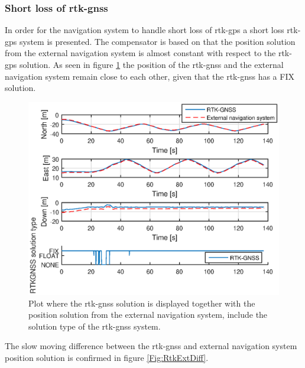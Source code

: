 \subsubsection{Short loss of \gls{rtk-gnss}}\label{ss:ShortLoss}
In order for the navigation system to handle short loss of \gls{rtk-gps} a short loss \gls{rtk-gps} system is presented. The compensator is based on that the position solution from the external navigation system is almost constant with respect to the \gls{rtk-gps} solution. As seen in figure \ref{Fig:RTKExternal} the position of the \gls{rtk-gnss} and the external navigation system remain  close to each other, given that the \gls{rtk-gnss} has a FIX solution. 
\begin{figure}[H]
\centering
\includegraphics[scale=0.8]{figs/Experiment/RtkExternal.eps}
\caption{Plot where the \gls{rtk-gnss} solution is displayed together with the position solution from the external navigation system, include the solution type of the \gls{rtk-gnss} system.}
\label{Fig:RTKExternal}
\end{figure}
The slow moving difference between the \gls{rtk-gnss} and external navigation system position solution is confirmed in figure \ref{Fig:RtkExtDiff}.
